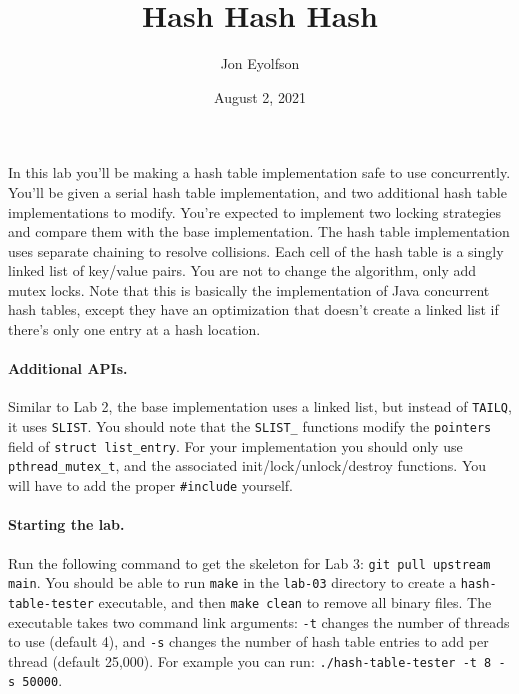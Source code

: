 

\title{Hash Hash Hash}
\author{Jon Eyolfson}
\date{August 2, 2021}



\maketitle

In this lab you'll be making a hash table implementation safe to use
concurrently.
You'll be given a serial hash table implementation, and two additional hash
table implementations to modify.
You're expected to implement two locking strategies and compare them with the
base implementation.
The hash table implementation uses separate chaining to resolve collisions.
Each cell of the hash table is a singly linked list of key/value pairs.
You are not to change the algorithm, only add mutex locks.
Note that this is basically the implementation of Java concurrent hash tables,
except they have an optimization that doesn't create a linked list if there's
only one entry at a hash location.

\paragraph{Additional APIs.}

Similar to Lab 2, the base implementation uses a linked list, but instead of
\texttt{TAILQ}, it uses \texttt{SLIST}.
You should note that the \texttt{SLIST\_} functions modify the \texttt{pointers}
field of \texttt{struct list\_entry}.
For your implementation you should only use \texttt{pthread\_mutex\_t}, and
the associated init/lock/unlock/destroy functions.
You will have to add the proper \texttt{\#include} yourself.

\paragraph{Starting the lab.}

Run the following command to get the skeleton for Lab 3:
\texttt{git pull upstream main}.
You should be able to run \texttt{make} in the \texttt{lab-03} directory to
create a \texttt{hash-table-tester} executable, and then \texttt{make clean}
to remove all binary files.
The executable takes two command link arguments: \texttt{-t} changes the number
of threads to use (default 4), and \texttt{-s} changes the number of hash table
entries to add per thread (default 25,000).
For example you can run: \texttt{./hash-table-tester -t 8 -s 50000}.

